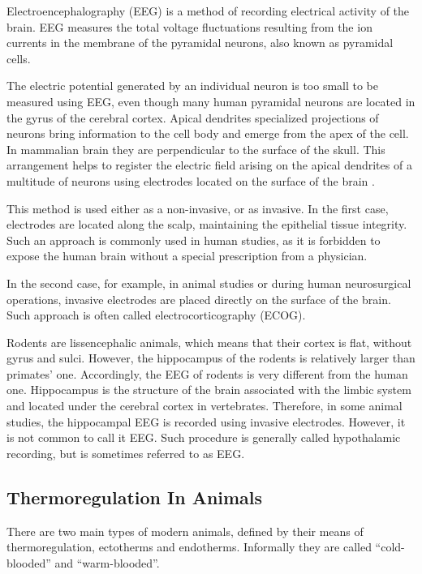 \documentclass[14pt,a4paper]{scrartcl}
\begin{document}
Electroencephalography (EEG) is a method of recording electrical activity of the brain. EEG measures the total voltage fluctuations resulting from the ion currents in the membrane of the pyramidal neurons, also known as pyramidal cells. 

The electric potential generated by an individual neuron is too small to be measured using EEG, even though many human pyramidal neurons are located in the gyrus of the cerebral cortex. Apical dendrites specialized projections of neurons bring information to the cell body and emerge from the apex of the cell. In mammalian brain they are perpendicular to the surface of the skull. This arrangement helps to register the electric field arising on the apical dendrites of a multitude of neurons using electrodes located on the surface of the brain \citep{Luck2005}. 

This method is used either as a non-invasive, or as invasive. In the first case, electrodes are located along the scalp, maintaining the epithelial tissue integrity. Such an approach is commonly used in human studies, as it is forbidden to expose the human brain without a special prescription from a physician.

In the second case, for example, in animal studies or during human neurosurgical operations, invasive electrodes are placed directly on the surface of the brain. Such approach is often called electrocorticography (ECOG). 

Rodents are lissencephalic animals, which means that their cortex is flat, without gyrus and sulci. However, the hippocampus of the rodents is relatively larger than primates’ one. Accordingly, the EEG of rodents is very different from the human one. Hippocampus is the structure of the brain associated with the limbic system and located under the cerebral cortex in vertebrates. Therefore, in some animal studies, the hippocampal EEG is recorded using invasive electrodes. However, it is not common to call it EEG. Such procedure is generally called hypothalamic recording, but is sometimes referred to as EEG. 

\subsection{Thermoregulation In Animals}
\label{sec:Introduction:Thermoregulation In Animals}

There are two main types of modern animals, defined by their means of thermoregulation, ectotherms and endotherms. Informally they are called “cold-blooded” and “warm-blooded”.
\end{document}
